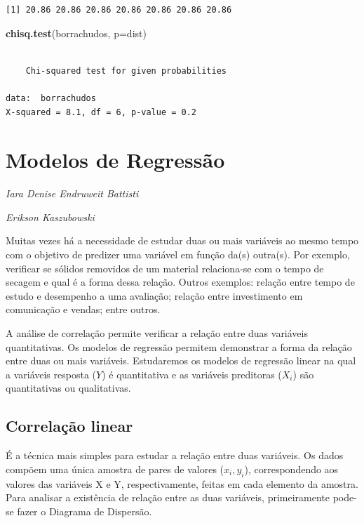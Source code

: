 \documentclass[12pt,brazil,oneside]{book}
\newenvironment{Shaded}{\begin{snugshade}}{\end{snugshade}}
\newcommand{\DataTypeTok}[1]{\textcolor[rgb]{0.13,0.29,0.53}{#1}}
\newcommand{\KeywordTok}[1]{\textcolor[rgb]{0.13,0.29,0.53}{\textbf{#1}}}
\newcommand{\NormalTok}[1]{#1}
\begin{document}
\begin{verbatim}
[1] 20.86 20.86 20.86 20.86 20.86 20.86 20.86
\end{verbatim}

\begin{Shaded}
\begin{Highlighting}[]
\KeywordTok{chisq.test}\NormalTok{(borrachudos, }\DataTypeTok{p=}\NormalTok{dist)}
\end{Highlighting}
\end{Shaded}

\begin{verbatim}

    Chi-squared test for given probabilities

data:  borrachudos
X-squared = 8.1, df = 6, p-value = 0.2
\end{verbatim}

\hypertarget{modelos-de-regressao}{%
\chapter{Modelos de Regressão}\label{modelos-de-regressao}}

\begin{flushright}
\emph{Iara Denise Endruweit Battisti}

\emph{Erikson Kaszubowski}
\end{flushright}

Muitas vezes há a necessidade de estudar duas ou mais variáveis ao mesmo
tempo com o objetivo de predizer uma variável em função da(s) outra(s).
Por exemplo, verificar se sólidos removidos de um material relaciona-se
com o tempo de secagem e qual é a forma dessa relação. Outros exemplos:
relação entre tempo de estudo e desempenho a uma avaliação; relação
entre investimento em comunicação e vendas; entre outros.

A análise de correlação permite verificar a relação entre duas variáveis
quantitativas. Os modelos de regressão permitem demonstrar a forma da
relação entre duas ou mais variáveis. Estudaremos os modelos de
regressão linear na qual a variáveis resposta (\(Y\)) é quantitativa e
as variáveis preditoras (\(X_i\)) são quantitativas ou qualitativas.

\hypertarget{correlacao-linear}{%
\section{Correlação linear}\label{correlacao-linear}}

É a técnica mais simples para estudar a relação entre duas variáveis. Os
dados compõem uma única amostra de pares de valores (\(x_i, y_i\)),
correspondendo aos valores das variáveis X e Y, respectivamente, feitas
em cada elemento da amostra. Para analisar a existência de relação entre
as duas variáveis, primeiramente pode-se fazer o Diagrama de Dispersão.
\end{document}
